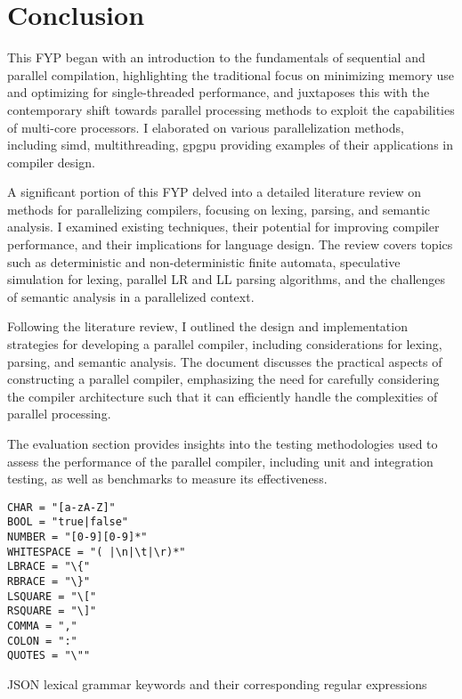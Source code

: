 \chapter{Conclusion} \label{conclusion} 
This FYP began with an introduction to the fundamentals of sequential and parallel compilation,
highlighting the traditional focus on minimizing memory use and optimizing for single-threaded
performance, and juxtaposes this with the contemporary shift towards parallel processing methods to
exploit the capabilities of multi-core processors. I elaborated on various parallelization methods,
including \gls{simd}, multithreading, \gls{gpgpu}  providing examples of their applications in
compiler design.

A significant portion of this FYP delved into a detailed literature review on methods for
parallelizing compilers, focusing on lexing, parsing, and semantic analysis. I examined existing
techniques, their potential for improving compiler performance, and their implications for language
design. The review covers topics such as deterministic and non-deterministic finite automata,
speculative simulation for lexing, parallel LR and LL parsing algorithms, and the challenges of
semantic analysis in a parallelized context.

Following the literature review, I outlined the design and implementation strategies for developing
a parallel compiler, including considerations for lexing, parsing, and semantic analysis. The
document discusses the practical aspects of constructing a parallel compiler, emphasizing the
need for carefully considering the compiler architecture such that it can efficiently handle the
complexities of parallel processing.

The evaluation section provides insights into the testing methodologies used to assess the
performance of the parallel compiler, including unit and integration testing, as well as benchmarks
to measure its effectiveness.

\begin{listing}[H]
\begin{verbatim}
CHAR = "[a-zA-Z]"
BOOL = "true|false"
NUMBER = "[0-9][0-9]*"
WHITESPACE = "( |\n|\t|\r)*"
LBRACE = "\{"
RBRACE = "\}"
LSQUARE = "\["
RSQUARE = "\]"
COMMA = ","
COLON = ":"
QUOTES = "\""
\end{verbatim}
\caption{JSON lexical grammar keywords and their corresponding regular expressions}
\label{lst:json_lexical_grammar}
\end{listing}

